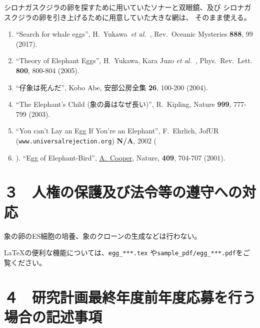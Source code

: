 \documentclass[11pt,a4j,dvipdfmx]{jarticle} 					%
\newcommand{\研究課題名}{象の卵}
\newcommand{\研究機関名}{逢坂大学}
\newcommand{\研究代表者氏名}{湯川秀樹}
\newcommand{\研究期間の最終元号年度}{10}  %
\newcommand{\paper}[6]{%
	\item ``#1'', #2, #3 {\bf #4}, #5 (#6).			%
}
\newcommand{\etal}{\textit{et al.\ }}
\newcommand{\yukawa}{H.~Yukawa}					%
\newcommand{\prl}{Phys.\ Rev.\ Lett.\ }		%
\begin{document}
	シロナガスクジラの卵を探すために用いていたソナーと双眼鏡、及び
	シロナガスクジラの卵を引き上げるために用意していた大きな網は、
	そのまま使える。
	\begin{enumerate}
		\paper{Search for whale eggs}{\yukawa\ \etal}{Rev.\ Oceanic Mysteries}{888}{99}{2017}
			\label{pub:whale}
				
		\paper{Theory of Elephant Eggs}{\yukawa, Kara Juzo \etal}{\prl}{800}{800-804}{2005}
			\label{pub:theoegg}
				
		\paper{仔象は死んだ}{Kobo Abe}{安部公房全集}{26}{100-200}{2004}
		
		\paper{The Elephant's Child (象の鼻はなぜ長い)}{R.~Kipling}{Nature}{999}{777-799}{2003}

		\paper{You can't Lay an Egg If You're an Elephant}{F.~Ehrlich}
			{JofUR\\({\tt www.universalrejection.org})}{{\bf N/A}}{2002}
		
		\item ``Egg of Elephant-Bird'', 
				\underline{A.~Cooper},
				Nature, {\bf 409}, 704-707 (2001).	%
	\end{enumerate}




\section{３　人権の保護及び法令等の遵守への対応}

	象の卵のES細胞の培養、象のクローンの生成などは行わない。

	\LaTeX の便利な機能については、\texttt{egg\_***.tex} や\texttt{sample\_pdf/egg\_***.pdf}をご覧ください。




\section{４　研究計画最終年度前年度応募を行う場合の記述事項}
\end{document}
